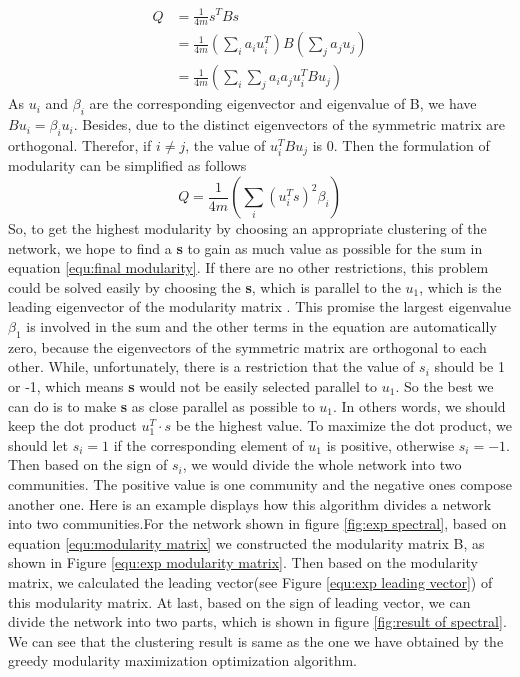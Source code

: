 \documentclass[12pt,oneside,final]{vlsithesis}
\begin{document}
\begin{equation}
\begin{split}
Q & = \frac{1}{4m}s^{T}Bs \\
& = \frac{1}{4m}(\sum_{i}a_{i}u_{i}^{T})B(\sum_{j}a_{j}u_{j}) \\
& = \frac{1}{4m}(\sum_{i}\sum_{j}a_{i}a_{j}u_{i}^{T}Bu_{j})
\end{split}
\end{equation}
As $u_{i}$ and $\beta_{i}$ are the corresponding eigenvector and eigenvalue of B, we have $Bu_{i} = \beta_{i}u_{i}$. Besides, due to the distinct eigenvectors of the symmetric matrix are orthogonal. Therefor, if $i \neq j$,  the value of $u_{i}^{T}Bu_{j}$ is 0. Then the formulation of modularity can be simplified as follows
\begin{equation}
Q = \frac{1}{4m}(\sum_{i}(u_{i}^{T}s)^{2}\beta_{i})
\label{equ:final modularity}
\end{equation}
So, to get the highest modularity by choosing an appropriate clustering of the network, we hope to find a \textbf{s} to gain as much value as possible for the sum in equation \ref{equ:final modularity}. If there are no other restrictions, this problem could be solved easily by choosing the \textbf{s}, which is parallel to the $u_{1}$, which is the leading eigenvector of the modularity matrix \cite{newman2010networks}. This promise the largest eigenvalue $\beta_{1}$ is involved in the sum and the other terms in the equation are automatically zero, because the eigenvectors of the symmetric matrix  are orthogonal to each other. While, unfortunately, there is a restriction that the value of $s_{i}$ should be 1 or -1, which means \textbf{s} would not be easily selected parallel to $u_{1}$. So the best we can do is to make \textbf{s} as close parallel as possible to $u_{1}$. In others words, we should keep the dot product $u_{1}^{T}\cdot s$ be the highest value. To maximize the dot product, we should let $s_{i} = 1$ if the corresponding element of $u_{1}$ is positive, otherwise $s_{i} = -1$. Then based on the sign of $s_{i}$, we would divide the whole network into two communities. The positive value is one community and the negative ones compose another one. Here is an example displays how this algorithm divides a network into two communities.For the network shown in figure \ref{fig:exp spectral}, based on equation \ref{equ:modularity matrix} we constructed the modularity matrix B, as shown in Figure \ref{equ:exp modularity matrix}. Then based on the modularity matrix, we calculated the leading vector(see Figure \ref{equ:exp leading vector}) of this modularity matrix. At last,  based on the sign of leading vector, we can divide the network into two parts, which is shown in figure \ref{fig:result of spectral}. We can see that the clustering result is same as the one we have obtained by the greedy modularity maximization optimization algorithm.
\end{document}
